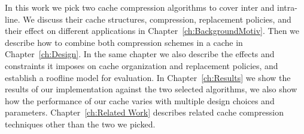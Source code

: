 In this work we pick two cache compression algorithms to cover inter and intra-line. We discuss their cache structures, compression, replacement policies, and their effect on different applications in Chapter~\ref{ch:BackgroundMotiv}. Then we describe how to combine both compression schemes in a cache in Chapter~\ref{ch:Design}. In the same chapter we also describe the effects and constraints it imposes on cache organization and replacement policies, and establish a roofline model for evaluation. In Chapter~\ref{ch:Results} we show the results of our implementation against the two selected algorithms, we also show how the performance of our cache varies with multiple design choices and parameters. Chapter~\ref{ch:Related Work} describes related cache compression techniques other than the two we picked.